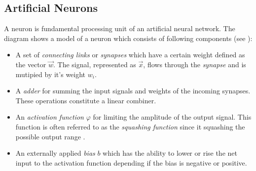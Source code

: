 \subsection{Artificial Neurons}

A neuron is fundamental processing unit of an artificial neural network. The diagram \label{fig:neuron} shows a model of a neuron which consists of following components (see \cite{Haykin:1998:NNC:521706}):
\begin{itemize}
  \item A set of \textit{connecting links} or \textit{synapses} which have a certain weight defined as the vector $\vec{w}$. The signal, represented as $\vec{x}$, flows through the \textit{synapse} and is mutipied by it's weight $w_i$.
  \item A \textit{adder} for summing the input signals and weights of the incoming synapses. These operations constitute a linear combiner.
  \item An \textit{activation function} $\varphi$ for limiting the amplitude of the output signal. This function is often referred to as the \textit{squashing function} since it squashing the possible output range \cite{Haykin:1998:NNC:521706}.
  \item An externally applied \textit{bias} $b$ which has the ability to lower or rise the net input to the activation function depending if the bias is negative or positive.
\end{itemize}
